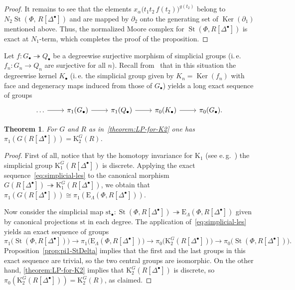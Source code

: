 \documentclass[oneside, 11pt]{amsart} \pdfoutput=1
\newcommand{\Ker}{\mathop{\mathrm{Ker}}\nolimits}
\newcommand{\K}{{\mathrm{K}}}
\newcommand{\St}{\mathop{\mathrm{St}}\nolimits}
\newcommand{\E}{\mathrm{E}}
\numberwithin{equation}{section}
\newtheorem{theorem}[lemma]{Theorem}
\theoremstyle{definition}
\begin{document}
\begin{proof}
It remains to see that the elements $x_{\alpha}\big(t_1t_2\,f(t_2)\big)^{g(t_2)}$ belong to $N_2\St(\Phi,\,R[\Delta^\bullet])$ and are mapped by $\partial_2$ onto the generating set of $\Ker(\partial_1)$ mentioned above. Thus, the normalized Moore complex for $\St(\Phi, R[\Delta^\bullet])$ is exact at $N_1$-term, which completes the proof of the proposition. \end{proof}

Let $f\colon G_\bullet\twoheadrightarrow Q_\bullet$ be a degreewise surjective morphism of simplicial groups (i.\,e. $f_n\colon G_n\to Q_n$ are surjective for all $n$). Recall from~\cite[Theorem~1.3]{Ina75} that in this situation the degreewise kernel $K_\bullet$ (i.\,e. the simplicial group given by $K_n = \Ker(f_n)$ with face and degeneracy maps induced from those of $G_\bullet$) yields a long exact sequence of groups
\begin{equation} \label{eq:simplicial-les} \begin{tikzcd} \ldots \ar{r} & \pi_{1}(G_\bullet) \ar{r} & \pi_1(Q_\bullet) \ar{r} & \pi_0(K_\bullet) \ar{r} & \pi_0(G_\bullet). \end{tikzcd} \end{equation}

\begin{theorem} \label{theorem:pi1-GRDelta}
 For $G$ and $R$ as in~\cref{theorem:LP-for-K2} one has $\pi_1(G(R[\Delta^\bullet])) = \K_2^G(R)$.
\end{theorem}
\begin{proof}
First of all, notice that by the homotopy invariance for $\K_1$ (see e.\,g.~\cite[Theorem~1.1]{Sta20}) the simplicial group $\K_1^G(R[\Delta^\bullet])$ is discrete. Applying the exact sequence~\eqref{eq:simplicial-les} to the canonical morphism $G(R[\Delta^\bullet]) \twoheadrightarrow \K_1^G(R[\Delta^\bullet])$, we obtain that $\pi_1(G( R[\Delta^\bullet])) \cong \pi_1(\E_\Lambda(\Phi, R[\Delta^\bullet]))$.

Now consider the simplicial map $\mathrm{st}_\bullet \colon \St(\Phi, R[\Delta^\bullet]) \twoheadrightarrow \E_\Lambda(\Phi, R[\Delta^\bullet])$ given by canonical projections $\mathrm{st}$ in each degree. The application of~\eqref{eq:simplicial-les} yields an exact sequence of groups
\[
\pi_1\bigl(\St(\Phi, R[\Delta^\bullet])\bigr) \to \pi_1\bigl(\E_\Lambda(\Phi, R[\Delta^\bullet])\bigr) \to \pi_0\bigl(\K_2^G( R[\Delta^\bullet])\bigr) \to \pi_0\bigl(\St(\Phi, R[\Delta^\bullet])\bigr).
\]
 Proposition~\ref{prop:pi1-StDelta} implies that the first and the last groups in this exact sequence are trivial, so the two central groups are isomorphic. On the other hand, \cref{theorem:LP-for-K2} implies that $\K_2^G(R[\Delta^\bullet])$ is discrete, so $\pi_0(\K_2^G(R[\Delta^\bullet])) = \K_2^G(R)$, as claimed.
\end{proof}
\end{document}
